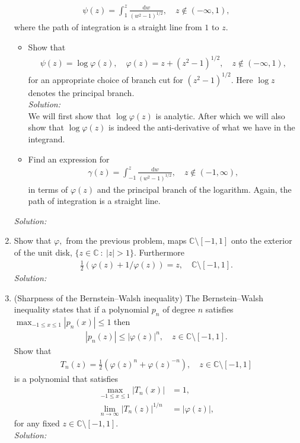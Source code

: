 \documentclass[10pt]{amsart}
\newcommand{\D}{\mathrm{d}}
\theoremstyle{nonumberplain}
\begin{document}
\begin{enumerate}[label={\bf {\arabic*}:}]
\begin{align*}
     \psi(z) = \int_1^z \frac{\D w}{(w^2 - 1)^{1/2}}, \quad z \not \in
      (-\infty, 1),
    \end{align*}
    where the path of integration is a straight line from $1$ to $z$.
    \begin{itemize}
   \item  Show that
    \begin{align*}
      \psi(z) = \log \varphi(z), \quad \varphi(z) = z + (z^2 -
      1)^{1/2}, \quad z \not \in
      (-\infty, 1),
    \end{align*}
   for an appropriate choice of branch cut for $(z^2 -
   1)^{1/2}$.  Here $\log z$ denotes the principal branch. \\
   \textit{Solution:} \\
   We will first show that $\log \varphi(z)$ is analytic. After which we will also show that $\log \varphi(z)$ is indeed the anti-derivative of what we have in the integrand.
   \item Find an expression for
   \begin{align*}
     \gamma(z) = \int_{-1}^z \frac{\D w}{(w^2 - 1)^{1/2}}, \quad z \not \in
      (-1, \infty),
   \end{align*}
   in terms of $\varphi(z)$ and the principal branch of the logarithm.  Again, the path of integration is a
   straight line.
 \end{itemize}
 \textit{Solution:} \\

 \item Show that $\varphi,$ from the previous problem, maps $\mathbb C \setminus [-1,1]$ onto the
   exterior of the unit disk, $\{ z \in \mathbb C ~:~ |z| > 1\}$.
   Furthermore
   \begin{align*}
     \frac 1 2 \left( \varphi(z) + 1/\varphi(z) \right) = z, \quad \mathbb C \setminus [-1,1].
   \end{align*}
\textit{Solution:} \\

   \item (Sharpness of the Bernstein--Walsh inequality)  The
     Bernstein--Walsh inequality states that if a polynomial $p_n$ of
     degree $n$ satisfies $\max_{-1 \leq x \leq 1} |p_n(x)| \leq 1$
     then
     \begin{align*}
       |p_n(z)| \leq |\varphi(z)|^n, \quad z \in \mathbb C \setminus [-1,1].
     \end{align*}
     Show that
     \begin{align*}
        T_n(z) = \frac 1 2 \left( \varphi(z)^n + \varphi(z)^{-n}
       \right), \quad z \in \mathbb C \setminus [-1,1]
     \end{align*}
     is a polynomial that satisfies
     \begin{align*}
       \max_{-1 \leq x \leq 1} |T_n(x)| &= 1,\\
       \lim_{n \to \infty} |T_n(z)|^{1/n} &= |\varphi(z)|,
     \end{align*}
     for any fixed $z \in \mathbb C \setminus [-1,1]$. \\
\textit{Solution:} \\
\end{enumerate}
\end{document}
